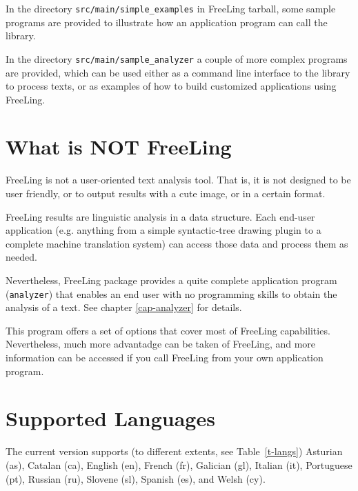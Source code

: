 \documentclass[a4paper]{book}
\begin{document}
In the directory \verb#src/main/simple_examples# in FreeLing tarball, some
sample programs are provided to illustrate how an application program 
can call the library.

In the directory \verb#src/main/sample_analyzer# a couple of more complex programs
are provided, which can be used either as a command line interface to the library to 
process texts, or as examples of how to build customized applications using FreeLing.

\section{What is NOT FreeLing}

FreeLing is not a user-oriented text analysis tool. That is, it is not
designed to be user friendly, or to output results with a cute image,
or in a certain format.

FreeLing results are linguistic analysis in a data structure. Each
end-user application (e.g. anything from a simple syntactic-tree drawing
plugin to a complete machine translation system) can access those data and
process them as needed.

Nevertheless, FreeLing package provides a quite complete application
program ({\tt analyzer}) that enables an end user with no programming skills
to obtain the analysis of a text. See chapter \ref{cap-analyzer} for details.

This program offers a set of options that cover most of FreeLing
capabilities. Nevertheless, much more advantadge can be taken of
FreeLing, and more information can be accessed if you call FreeLing
from your own application program.

\section{Supported Languages}

The current version supports (to different extents, see
Table~\ref{t-langs}) Asturian (as), Catalan (ca), English (en), French
(fr), Galician (gl), Italian (it), Portuguese (pt), Russian (ru),
Slovene (sl), Spanish (es), and Welsh (cy).
\end{document}
